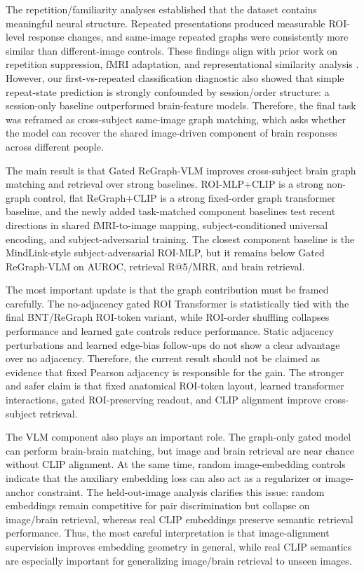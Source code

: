 \documentclass{article}
\begin{document}
The repetition/familiarity analyses established that the dataset contains meaningful neural structure. Repeated presentations produced measurable ROI-level response changes, and same-image repeated graphs were consistently more similar than different-image controls. These findings align with prior work on repetition suppression, fMRI adaptation, and representational similarity analysis \citep{grill2001fmri,henson2003repetition,grill2006repetition,krekelberg2006adaptation,kriegeskorte2008rsa}. However, our first-vs-repeated classification diagnostic also showed that simple repeat-state prediction is strongly confounded by session/order structure: a session-only baseline outperformed brain-feature models. Therefore, the final task was reframed as cross-subject same-image graph matching, which asks whether the model can recover the shared image-driven component of brain responses across different people.

The main result is that Gated ReGraph-VLM improves cross-subject brain graph matching and retrieval over strong baselines. ROI-MLP+CLIP is a strong non-graph control, flat ReGraph+CLIP is a strong fixed-order graph transformer baseline, and the newly added task-matched component baselines test recent directions in shared fMRI-to-image mapping, subject-conditioned universal encoding, and subject-adversarial training. The closest component baseline is the MindLink-style subject-adversarial ROI-MLP, but it remains below Gated ReGraph-VLM on AUROC, retrieval R@5/MRR, and brain retrieval.

The most important update is that the graph contribution must be framed carefully. The no-adjacency gated ROI Transformer is statistically tied with the final BNT/ReGraph ROI-token variant, while ROI-order shuffling collapses performance and learned gate controls reduce performance. Static adjacency perturbations and learned edge-bias follow-ups do not show a clear advantage over no adjacency. Therefore, the current result should not be claimed as evidence that fixed Pearson adjacency is responsible for the gain. The stronger and safer claim is that fixed anatomical ROI-token layout, learned transformer interactions, gated ROI-preserving readout, and CLIP alignment improve cross-subject retrieval.

The VLM component also plays an important role. The graph-only gated model can perform brain-brain matching, but image and brain retrieval are near chance without CLIP alignment. At the same time, random image-embedding controls indicate that the auxiliary embedding loss can also act as a regularizer or image-anchor constraint. The held-out-image analysis clarifies this issue: random embeddings remain competitive for pair discrimination but collapse on image/brain retrieval, whereas real CLIP embeddings preserve semantic retrieval performance. Thus, the most careful interpretation is that image-alignment supervision improves embedding geometry in general, while real CLIP semantics are especially important for generalizing image/brain retrieval to unseen images.
\end{document}
